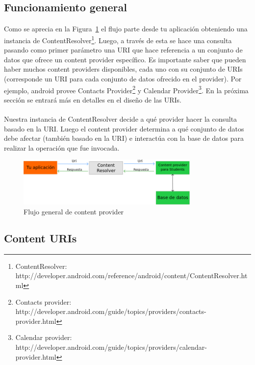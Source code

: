 \documentclass[10pt]{extarticle}
\begin{document}
\subsection{Funcionamiento general}

\paragraph{}
Como se aprecia en la Figura~\ref{fig:flujo_content_provider} el flujo parte desde tu aplicación obteniendo una instancia de ContentResolver\footnote{ContentResolver: http://developer.android.com/reference/android/content/ContentResolver.html}. Luego, a través de esta se hace una consulta pasando como primer parámetro una URI que hace referencia a un conjunto de datos que ofrece un content provider específico. Es importante saber que pueden haber muchos content providers disponibles, cada uno con su conjunto de URIs (corresponde un URI para cada conjunto de datos ofrecido en el provider). Por ejemplo, android provee Contacts Provider\footnote{Contacts provider: http://developer.android.com/guide/topics/providers/contacts-provider.html} y Calendar Provider\footnote{Calendar provider: http://developer.android.com/guide/topics/providers/calendar-provider.html}. En la próxima sección se entrará más en detalles en el diseño de las URIs.

\paragraph{}
Nuestra instancia de ContentResolver decide a qué provider hacer la consulta basado en la URI. Luego el content provider determina a qué conjunto de datos debe afectar (también basado en la URI) e interactúa con la base de datos para realizar la operación que fue invocada.
\begin{figure}[H]
    \centering
    \includegraphics[width=0.8\textwidth]{ContentProviderGeneral.png}
    \caption{Flujo general de content provider}
    \label{fig:flujo_content_provider}
\end{figure}



\subsection{Content URIs}
\end{document}
